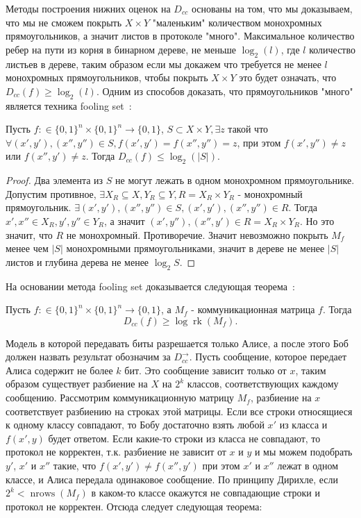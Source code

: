 \documentclass{article}
\begin{document}
Методы построения нижних оценок на $D_{cc}$ основаны на том, что мы доказываем, что мы не сможем покрыть $X \times Y$ "маленьким" количеством монохромных прямоугольников, а значит листов в протоколе "много". Максимальное количество ребер на пути из корня в бинарном дереве, не меньше $\log_2(l)$, где $l$ количество листьев в дереве, таким образом если мы докажем что требуется не менее $l$ монохромных прямоугольников, чтобы покрыть $X \times Y$ это будет означать, что $D_{cc}(f) \geq \log_2(l)$. Одним из способов доказать, что прямоугольников "много" является техника fooling set~\cite{nisan}: 
\begin{theorem}
Пусть $f: \in \{0, 1\}^n \times \{0, 1\}^n \to \{0, 1\}$, $S \subset X \times Y, \exists z$ такой что $\forall (x', y'), (x'', y'') \in S, f(x', y') = f(x'', y'') = z$, при этом $f(x', y'') \neq z$ или $f(x'', y') \neq z$. Тогда $D_{cc}(f) \leq \log_2(|S|)$.
\begin{proof}
    Два элемента из $S$ не могут лежать в одном монохромном прямоугольнике. Допустим противное, $\exists X_R \subseteq X, Y_R \subseteq Y, R = X_R \times Y_R$ - монохромный прямоугольник. $\exists (x', y'), (x'', y'') \in S, (x', y'), (x'', y'') \in R$. Тогда $x', x'' \in X_R, y', y'' \in Y_R$, а значит $(x', y''), (x'', y') \in R = X_R \times Y_R$. Но это значит, что $R$ не монохромный. Противоречие. Значит невозможно покрыть $M_f$ менее чем $|S|$ монохромными прямоугольниками, значит в дереве не менее $|S|$ листов и глубина дерева не менее $\log_2 S$.   
\end{proof}
\end{theorem}
На основании метода fooling set доказывается следующая теорема~\cite{nisan}:
\begin{theorem}
    Пусть $f: \in \{0, 1\}^n \times \{0, 1\}^n \to \{0, 1\}$, а $M_f$ - коммуникационная матрица $f$. Тогда
    $$D_{cc}(f) \geq \log \operatorname{rk}(M_f).$$
\end{theorem}
Модель в которой передавать биты разрешается только Алисе, а после этого Боб должен назвать результат обозначим за $D_{cc}^{\to}$. Пусть сообщение, которое передает Алиса содержит не более $k$ бит. Это сообщение зависит только от $x$, таким образом существует разбиение на $X$ на $2^k$ классов, соответствующих каждому сообщению. Рассмотрим коммуникационную матрицу $M_f$, разбиение на $x$ соответствует разбиению на строках этой матрицы. Если все строки относящиеся к одному классу совпадают, то Бобу достаточно взять любой $x'$ из класса и $f(x', y)$ будет ответом. Если какие-то строки из класса не совпадают, то протокол не корректен, т.к. разбиение не зависит от $x$ и $y$ и мы можем подобрать $y'$, $x'$ и $x''$ такие, что $f(x', y') \neq f(x'', y')$ при этом $x'$ и $x''$ лежат в одном классе, и Алиса передала одинаковое сообщение. По принципу Дирихле, если $2^k < \operatorname{nrows}(M_f)$ в каком-то классе окажутся не совпадающие строки и протокол не корректен. Отсюда следует следующая теорема:~\cite{nisan}   
\end{document}
